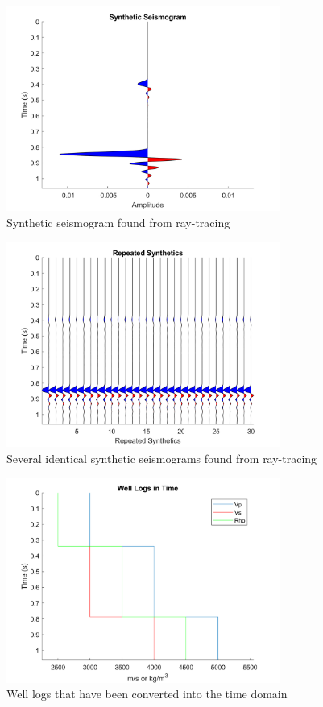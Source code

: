\documentclass[12pt]{article}
\begin{document}
\begin{figure}[!htb]
	\centering
	\includegraphics[width=0.8\textwidth]{Figures/RT3SyntheticSeismogram.png}
	\caption[Ray-tracing 3-layer synthetic seismogram]{Synthetic seismogram found from ray-tracing}
	\label{fig:RT3Syn}
\end{figure}

\begin{figure}[!htb]
	\centering
	\includegraphics[width=0.8\textwidth]{Figures/RT3SeveralSynthetics.png}
	\caption[Ray-tracing 3-layer several synthetic seismograms]{Several identical synthetic seismograms found from ray-tracing}
	\label{fig:RT3Synsev}
\end{figure}

\begin{figure}[!htb]
	\centering
	\includegraphics[width=0.8\textwidth]{Figures/RT3LogsinTime.png}
	\caption[Ray-tracing 3-layer time-converted well logs]{Well logs that have been converted into the time domain}
	\label{fig:RT3TimeLog}
\end{figure}
\end{document}
